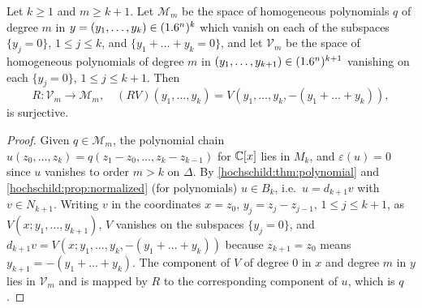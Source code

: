 \begin{lemma}\label{hochschild:lem:poly-lift}
Let $k\ge1$ and $m\ge k+1$. Let $\mathcal M_m$ be the space of homogeneous
polynomials $q$ of degree $m$ in $y=(y_1,\dots,y_k)\in(1.6^n)^k$ which vanish
on each of the subspaces $\{y_j=0\}$, $1\le j\le k$, and
$\{y_1+\dots+y_k=0\}$, and let $\mathcal V_m$ be the space of homogeneous
polynomials of degree $m$ in $(y_1,\dots,y_{k+1})\in(1.6^n)^{k+1}$ vanishing on
each $\{y_j=0\}$, $1\le j\le k+1$. Then
\begin{equation*}
  R:\mathcal V_m\longrightarrow\mathcal M_m,\quad
  (RV)(y_1,\dots,y_k)=V(y_1,\dots,y_k,-(y_1+\dots+y_k)),
\end{equation*}
is surjective.
\end{lemma}
\begin{proof}
Given $q\in\mathcal M_m$, the polynomial chain
$u(z_0,\dots,z_k)=q(z_1-z_0,\dots,z_k-z_{k-1})$ for $\mathbb{C}[x]$ lies in $M_k$, and
$\varepsilon(u)=0$ since $u$ vanishes to order $m>k$ on $\Delta$. By
\cref{hochschild:thm:polynomial} and \cref{hochschild:prop:normalized} (for
polynomials) $u\in B_k$, i.e.\ $u=d_{k+1}v$ with $v\in N_{k+1}$. Writing $v$
in the coordinates $x=z_0$, $y_j=z_j-z_{j-1}$, $1\le j\le k+1$, as
$V(x;y_1,\dots,y_{k+1})$, $V$ vanishes on the subspaces $\{y_j=0\}$, and
$d_{k+1}v=V(x;y_1,\dots,y_k,-(y_1+\dots+y_k))$ because $z_{k+1}=z_0$ means
$y_{k+1}=-(y_1+\dots+y_k)$. The component of $V$ of degree $0$ in $x$ and
degree $m$ in $y$ lies in $\mathcal V_m$ and is mapped by $R$ to the
corresponding component of $u$, which is $q$.
\end{proof}

